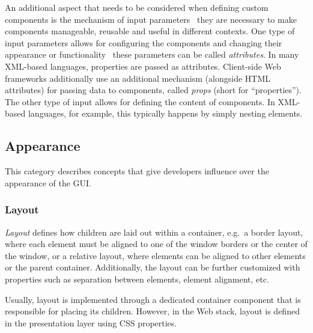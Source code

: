 An additional aspect that needs to be considered when defining custom components is the mechanism of input parameters \textendash\ they are necessary to make components manageable, reusable and useful in different contexts.
One type of input parameters allows for configuring the components and changing their appearance or functionality \textendash\ these parameters can be called \emph{attributes}.
In many XML-based languages, properties are passed as attributes.
Client-side Web frameworks additionally use an additional mechanism (alongside HTML attributes) for passing data to components, called \emph{props} (short for \enquote{properties}).
The other type of input allows for defining the content of components.
In XML-based languages, for example, this typically happens by simply nesting elements.

\subsection{Appearance}\label{subsec:appearance}
This category describes concepts that give developers influence over the appearance of the GUI\@.

\subsubsection{Layout}
\emph{Layout} defines how children are laid out within a container, e.g.\ a border layout, where each element must be aligned to one of the window borders or the center of the window, or a relative layout, where elements can be aligned to other elements or the parent container.
Additionally, the layout can be further customized with properties such as separation between elements, element alignment, etc.

Usually, layout is implemented through a dedicated container component that is responsible for placing its children.
However, in the Web stack, layout is defined in the presentation layer using CSS properties.

